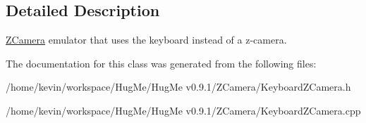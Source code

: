 \subsection{Detailed Description}
\hyperlink{classZCamera}{ZCamera} emulator that uses the keyboard instead of a z-\/camera. 

The documentation for this class was generated from the following files:\begin{DoxyCompactItemize}
\item 
/home/kevin/workspace/HugMe/HugMe v0.9.1/ZCamera/KeyboardZCamera.h\item 
/home/kevin/workspace/HugMe/HugMe v0.9.1/ZCamera/KeyboardZCamera.cpp\end{DoxyCompactItemize}
